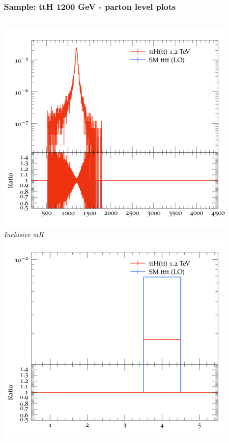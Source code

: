 \documentclass{beamer}
\begin{document}
\begin{frame}
\frametitle{Sample: ttH 1200 GeV - parton level plots}
\begin{columns}
\includegraphics[width=\textwidth]{../plots/ttH_1200/tttt_ttH/Inclusive_mH.png}\\
\textit{\small Inclusive mH}
\includegraphics[width=\textwidth]{../plots/ttH_1200/tttt_ttH/Inclusive_nTop.png}\\

\end{columns}
\end{frame}
\end{document}
